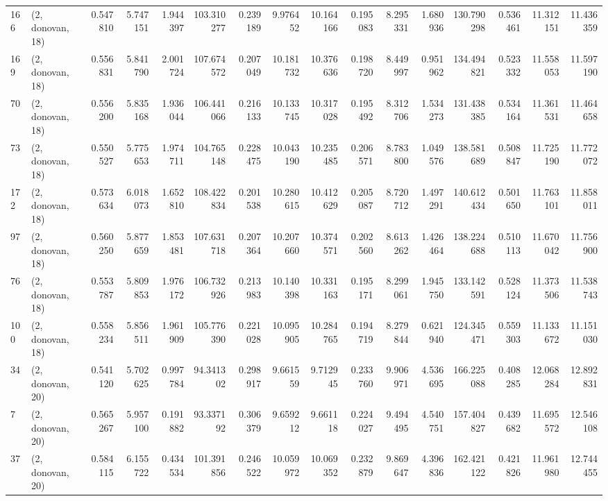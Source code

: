 \begin{tabular}{llrrrrrrrrrrrrrr}
166 &  (2, donovan, 18) &   0.547810 &   5.747151 &  1.944397 &  103.310277 &  0.239189 &   9.976452 &  10.164166 &  0.195083 &   8.295331 &   1.680936 &  130.790298 &  0.536461 &  11.312151 &  11.436359 \\
169 &  (2, donovan, 18) &   0.556831 &   5.841790 &  2.001724 &  107.674572 &  0.207049 &  10.181732 &  10.376636 &  0.198720 &   8.449997 &   0.951962 &  134.494821 &  0.523332 &  11.558053 &  11.597190 \\
70  &  (2, donovan, 18) &   0.556200 &   5.835168 &  1.936044 &  106.441066 &  0.216133 &  10.133745 &  10.317028 &  0.195492 &   8.312706 &   1.534273 &  131.438385 &  0.534164 &  11.361531 &  11.464658 \\
73  &  (2, donovan, 18) &   0.550527 &   5.775653 &  1.974711 &  104.765148 &  0.228475 &  10.043190 &  10.235485 &  0.206571 &   8.783800 &   1.049576 &  138.581689 &  0.508847 &  11.725190 &  11.772072 \\
172 &  (2, donovan, 18) &   0.573634 &   6.018073 &  1.652810 &  108.422834 &  0.201538 &  10.280615 &  10.412629 &  0.205087 &   8.720712 &   1.497291 &  140.612434 &  0.501650 &  11.763101 &  11.858011 \\
97  &  (2, donovan, 18) &   0.560250 &   5.877659 &  1.853481 &  107.631718 &  0.207364 &  10.207660 &  10.374571 &  0.202560 &   8.613262 &   1.426464 &  138.224688 &  0.510113 &  11.670042 &  11.756900 \\
76  &  (2, donovan, 18) &   0.553787 &   5.809853 &  1.976172 &  106.732926 &  0.213983 &  10.140398 &  10.331163 &  0.195171 &   8.299061 &   1.945750 &  133.142591 &  0.528124 &  11.373506 &  11.538743 \\
100 &  (2, donovan, 18) &   0.558234 &   5.856511 &  1.961909 &  105.776390 &  0.221028 &  10.095905 &  10.284765 &  0.194719 &   8.279844 &   0.621940 &  124.345471 &  0.559303 &  11.133672 &  11.151030 \\
34  &  (2, donovan, 20) &   0.541120 &   5.702625 &  0.997784 &   94.341302 &  0.298917 &   9.661559 &   9.712945 &  0.233760 &   9.906971 &   4.536695 &  166.225088 &  0.408285 &  12.068284 &  12.892831 \\
7   &  (2, donovan, 20) &   0.565267 &   5.957100 &  0.191882 &   93.337192 &  0.306379 &   9.659212 &   9.661118 &  0.224027 &   9.494495 &   4.540751 &  157.404827 &  0.439682 &  11.695572 &  12.546108 \\
37  &  (2, donovan, 20) &   0.584115 &   6.155722 &  0.434534 &  101.391856 &  0.246522 &  10.059972 &  10.069352 &  0.232879 &   9.869647 &   4.396836 &  162.421122 &  0.421826 &  11.961980 &  12.744455 \\

\end{tabular}
